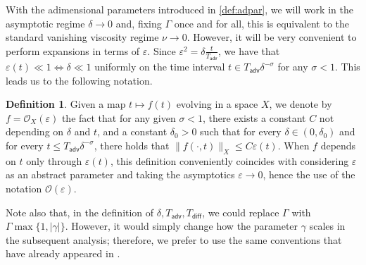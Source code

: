 \documentclass[11pt,reqno,a4paper]{amsart}
\def\eps{\varepsilon}
\newcommand{\cO}{\mathcal{O}}
\newcommand{\adv}{\mathsf{adv}}
\newcommand{\diff}{\mathsf{diff}}
\newcommand{\1}{\mathbbm{1}}
\theoremstyle{definition}
\newtheorem{definition}[proposition]{Definition}
\theoremstyle{definition}
\numberwithin{equation}{section}
\begin{document}
With the adimensional parameters introduced in \cref{def:adpar}, we will work in the asymptotic regime $\delta \to 0$ and, fixing $\Gamma$ once and for all, this is equivalent to the standard vanishing viscosity regime $\nu \to 0$. However, it will be very convenient to perform expansions in terms of $\eps$. Since $\eps^2 = \delta \frac{t}{T_\adv}$, we have that $\eps(t) \ll 1 \Longleftrightarrow \delta \ll 1$ uniformly on the time interval $t \in T_\adv \delta^{-\sigma}$ for any $\sigma < 1$. This leads us to the following notation.
\begin{definition}
     Given a map $t\mapsto f(t)$ evolving in a space $X$, we denote by $f = \cO_X(\eps)$ the fact that for any given $\sigma < 1$, there exists a constant $C$ not depending on $\delta$ and $t$, and a constant $\delta_0 > 0 $ such that for every $\delta \in (0,\delta_0)$ and for every $t \le T_\adv \delta^{-\sigma}$, there holds that $\| f(\cdot,t) \|_X \le C \eps(t)$. When $f$ depends on $t$ only through $\eps(t)$, this definition conveniently coincides with considering $\eps$ as an abstract parameter and taking the asymptotics $\eps \to 0$, hence the use of the notation $\cO(\eps)$.
\end{definition}
   Note also that, in the definition of $\delta,T_\adv, T_\diff$, we could  replace $\Gamma$ with $\Gamma\max\{1,|\gamma|\}$. However, it would simply change how the parameter $\gamma$ scales in the subsequent analysis; therefore, we prefer to use the same conventions that have already appeared in \cite{dolce2024long}.

\medskip
\end{document}
